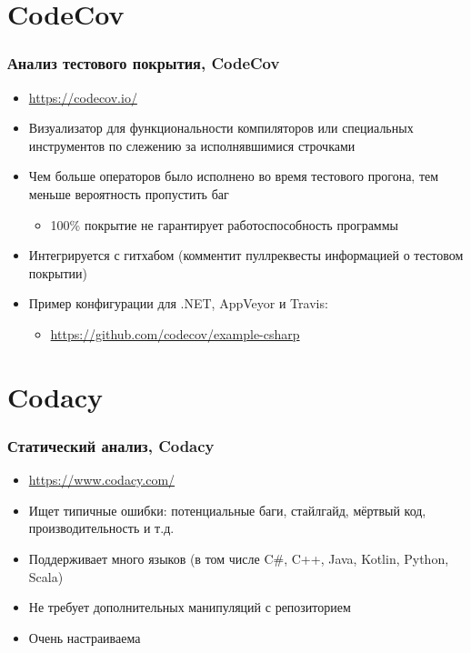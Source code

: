 \documentclass[xetex,mathserif,serif]{beamer}
\begin{document}
	\section{CodeCov}

	\begin{frame}
		\frametitle{Анализ тестового покрытия, CodeCov}
		\begin{itemize}
			\item \url{https://codecov.io/}
			\item Визуализатор для функциональности компиляторов или специальных инструментов по слежению за исполнявшимися строчками
			\item Чем больше операторов было исполнено во время тестового прогона, тем меньше вероятность пропустить баг
			\begin{itemize}
				\item 100\% покрытие не гарантирует работоспособность программы
			\end{itemize}
			\item Интегрируется с гитхабом (комментит пуллреквесты информацией о тестовом покрытии)
			\item Пример конфигурации для .NET, AppVeyor и Travis:
			\begin{itemize}
				\item \url{https://github.com/codecov/example-csharp}
			\end{itemize}
		\end{itemize}
	\end{frame}

	\section{Codacy}

	\begin{frame}
		\frametitle{Статический анализ, Codacy}
		\begin{itemize}
			\item \url{https://www.codacy.com/}
			\item Ищет типичные ошибки: потенциальные баги, стайлгайд, мёртвый код, производительность и т.д.
			\item Поддерживает много языков (в том числе C\#, C++, Java, Kotlin, Python, Scala)
			\item Не требует дополнительных манипуляций с репозиторием
			\item Очень настраиваема
		\end{itemize}
	\end{frame}
\end{document}
